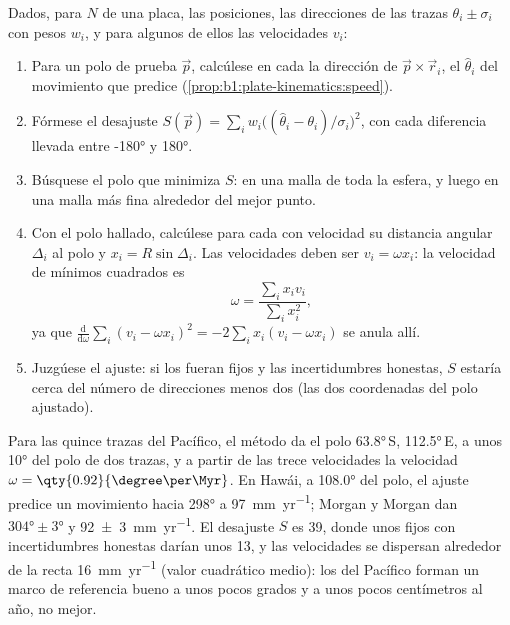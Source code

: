 \begin{method}\label{met:b1:hotspots:pole-fit}
Dados, para $N$  de una placa, las posiciones, las direcciones de las trazas $\theta_i \pm \sigma_i$ con pesos $w_i$, y para algunos
de ellos las velocidades $v_i$:
\begin{enumerate}
  \item Para un polo de prueba $\vec p$, calcúlese en cada  la dirección de $\vec p\times\vec r_i$, el  $\hat\theta_i$ del
        movimiento que predice (\cref{prop:b1:plate-kinematics:speed}).
  \item Fórmese el desajuste $S(\vec p) = \sum_i w_i\bigl((\hat\theta_i -
        \theta_i)/\sigma_i\bigr)^2$, con cada diferencia llevada entre \ang{-180} y \ang{180}.
  \item Búsquese el polo que minimiza $S$: en una malla de toda la esfera, y luego en una malla más fina alrededor del mejor punto.
  \item Con el polo hallado, calcúlese para cada  con velocidad su distancia angular $\Delta_i$ al polo y $x_i = R\sin\Delta_i$. Las
        velocidades deben ser $v_i = \omega x_i$: la velocidad de mínimos cuadrados es
        \[
          \omega = \frac{\sum_i x_i v_i}{\sum_i x_i^2},
        \]
        ya que $\frac{\mathrm d}{\mathrm d\omega}\sum_i (v_i - \omega x_i)^2 =
        -2\sum_i x_i(v_i - \omega x_i)$ se anula allí.
  \item Juzgúese el ajuste: si los  fueran fijos y las incertidumbres honestas, $S$ estaría cerca del número de direcciones menos dos
        (las dos coordenadas del polo ajustado).
\end{enumerate}
\end{method}

Para las quince trazas del Pacífico, el método da el polo \ang{63.8}\,S, \ang{112.5}\,E, a unos \ang{10} del polo de dos trazas, y a partir de las trece
velocidades la velocidad $\omega = \qty{0.92}{\degree\per\Myr}$. En Hawái, a \ang{108.0} del polo, el ajuste predice un movimiento hacia \ang{298} a
\qty{97}{mm.yr^{-1}}; Morgan y Morgan dan $\ang{304}\pm\ang{3}$ y \qty[uncertainty-mode=separate]{92 \pm 3}{mm.yr^{-1}}. El desajuste $S$ es 39, donde
unos  fijos con incertidumbres honestas darían unos 13, y las velocidades se dispersan alrededor de la recta \qty{16}{mm.yr^{-1}}
(valor cuadrático medio): los  del Pacífico forman un marco de referencia bueno a unos pocos grados y a unos pocos centímetros al año,
no mejor.

